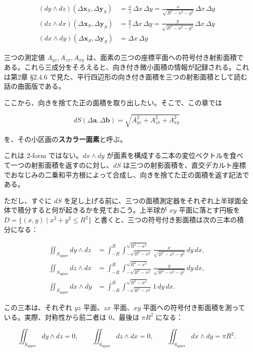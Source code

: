 \documentclass[a4paper,12pt,openany]{book}
\begin{document}
\[\begin{aligned}
(dy \wedge dz)(\Delta\mathbf{x}_S,\Delta\mathbf{y}_S) &= \frac{x}{z}\,\Delta x\,\Delta y
= \frac{x}{\sqrt{R^2-x^2-y^2}}\,\Delta x\,\Delta y \\[4pt]
(dz \wedge dx)(\Delta\mathbf{x}_S,\Delta\mathbf{y}_S) &= \frac{y}{z}\,\Delta x\,\Delta y
= \frac{y}{\sqrt{R^2-x^2-y^2}}\,\Delta x\,\Delta y \\[4pt]
(dx \wedge dy)(\Delta\mathbf{x}_S,\Delta\mathbf{y}_S) &= \Delta x\,\Delta y
\end{aligned}\]

三つの測定値 \(A_{yz},A_{zx},A_{xy}\)
は、面素の三つの座標平面への符号付き射影面積である。これら三成分をそろえると、向き付き微小面積の情報が記録される。これは第2章
§2.4.6
で見た、平行四辺形の向き付き面積を三つの射影面積として読む話の曲面版である。

ここから、向きを捨てた正の面積を取り出したい。そこで、この章では

\[
dS(\Delta\mathbf{a},\Delta\mathbf{b})
= \sqrt{A_{yz}^2+A_{zx}^2+A_{xy}^2}
\]

を、その小区画の\textbf{スカラー面素}と呼ぶ。

これは \(2\)-form ではない。\(dx\wedge dy\)
が面素を構成する二本の変位ベクトルを食べて一つの射影面積を返すのに対し、\(dS\)
は三つの射影面積を、直交デカルト座標でおなじみの二乗和平方根によって合成し、向きを捨てた正の面積を返す記法である。

ただし、すぐに \(dS\)
を足し上げる前に、三つの面積測定器をそれぞれ上半球面全体で積分すると何が起きるかを見ておこう。上半球が
\(xy\) 平面に落とす円板を \(D=\{(x,y)\mid x^2+y^2\le R^2\}\)
と書くと、三つの符号付き影面積は次の三本の積分になる：

\[\begin{aligned}
\iint_{S_{\text{upper}}} dy\wedge dz
&= \int_{-R}^{R}\int_{-\sqrt{R^2-x^2}}^{\sqrt{R^2-x^2}}
\frac{x}{\sqrt{R^2-x^2-y^2}}\,dy\,dx, \\[4pt]
\iint_{S_{\text{upper}}} dz\wedge dx
&= \int_{-R}^{R}\int_{-\sqrt{R^2-x^2}}^{\sqrt{R^2-x^2}}
\frac{y}{\sqrt{R^2-x^2-y^2}}\,dy\,dx, \\[4pt]
\iint_{S_{\text{upper}}} dx\wedge dy
&= \int_{-R}^{R}\int_{-\sqrt{R^2-x^2}}^{\sqrt{R^2-x^2}}
1\,dy\,dx.
\end{aligned}\]

この三本は、それぞれ \(yz\) 平面、\(zx\) 平面、\(xy\)
平面への符号付き影面積を測っている。実際、対称性から前二者は
\(0\)、最後は \(\pi R^2\) になる：

\[
\iint_{S_{\text{upper}}} dy\wedge dz=0,\qquad
\iint_{S_{\text{upper}}} dz\wedge dx=0,\qquad
\iint_{S_{\text{upper}}} dx\wedge dy=\pi R^2.
\]
\end{document}
